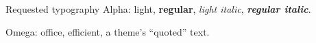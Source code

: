 \documentclass[11pt,aspectratio=169]{beamer}
\date{}
\begin{document}
\begin{frame}{Requested typography}
Alpha: light, \textbf{regular}, \textit{light italic}, \textbf{\textit{regular italic}}.

Omega: office, efficient, a theme's ``quoted'' text.
\end{frame}
\end{document}
